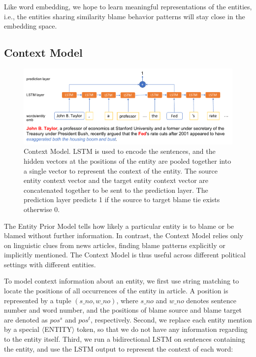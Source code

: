 \documentclass[11pt,a4paper]{article}
\begin{document}
Like word embedding, we hope to learn meaningful representations of the entities, i.e., the entities sharing similarity blame behavior patterns will stay close in the embedding space.

\subsection{Context Model}
\label{contextmodel}

\begin{figure}[!tp] 
  \centering 
  \includegraphics[width=5.5in]{contextmodel.pdf}
  \caption{Context Model. LSTM is used to encode the sentences, and the hidden vectors at the positions of the entity are pooled together into a single vector to represent the context of the entity. The source entity context vector and the target entity context vector are concatenated together to be sent to the prediction layer. The prediction layer predicts 1 if the source to target blame tie exists otherwise 0.}
  \label{figure:contextmodel}
\end{figure}


The Entity Prior Model tells how likely a particular entity is to blame or be blamed without further information. In contrast, the Context Model relies only on linguistic clues from news articles, finding blame patterns explicitly or implicitly mentioned. The Context Model is thus useful across different political settings with different entities.

To model context information about an entity, we first use string matching to locate the positions of all occurrences of the entity in article. A position is represented by a tuple $(s\_no, w\_no)$, where $s\_no$ and $w\_no$ denotes sentence number and word number, and the positions of blame source and blame target are denoted as $pos^s$ and $pos^t$, respectively. Second, we replace each entity mention by a special $\langle$ENTITY$\rangle$ token, so that we do not have any information regarding to the entity itself. Third, we run a bidirectional LSTM on sentences containing the entity, and use the LSTM output to represent the context of each word:
\end{document}
